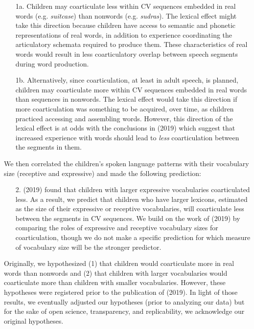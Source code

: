 \documentclass[a4paper,man,natbib,donotrepeattitle, apacite]{apa6}
\begin{document}
\begin{enumerate}
\item[1a.] Children may coarticulate less within CV sequences embedded in real words (e.g. \textit{suitcase}) than nonwords (e.g. \textit{sudras}). The lexical effect might take this direction because children have access to semantic and phonetic representations of real words, in addition to experience coordinating the articulatory schemata required to produce them. These characteristics of real words would result in less coarticulatory overlap between speech segments during word production.

\item[1b.] Alternatively, since coarticulation, at least in adult speech, is planned, children may coarticulate more within CV sequences embedded in real words than sequences in nonwords. The lexical effect would take this direction if more coarticulation was something to be acquired, over time, as children practiced accessing and assembling words. However, this direction of the lexical effect is at odds with the conclusions in \citeauthor{noiraySpokenLanguageDevelopment2019} (2019) which suggest that increased experience with words should lead to \textit{less} coarticulation between the segments in them. 
\end{enumerate}

We then correlated the children’s spoken language patterns with their vocabulary size (receptive and expressive) and made the following prediction: 

\begin{enumerate}
\item[2.] \citeauthor{noiraySpokenLanguageDevelopment2019} (2019) found that children with larger expressive vocabularies coarticulated less. As a result, we predict that children who have larger lexicons, estimated as the size of their expressive or receptive vocabularies, will coarticulate less between the segments in CV sequences. We build on the work of \citeauthor{noiraySpokenLanguageDevelopment2019} (2019) by comparing the roles of expressive and receptive vocabulary sizes for coarticulation, though we do not make a specific prediction for which measure of vocabulary size will be the stronger predictor.
\end{enumerate}

Originally, we hypothesized (1) that children would coarticulate more in real words than nonwords and (2) that children with larger vocabularies would coarticulate more than children with smaller vocabularies. However, these hypotheses were registered prior to the publication of \citeauthor{noiraySpokenLanguageDevelopment2019} (2019). In light of those results, we eventually adjusted our hypotheses (prior to analyzing our data) but for the sake of open science, transparency, and replicability, we acknowledge our original hypotheses. 
\end{document}
